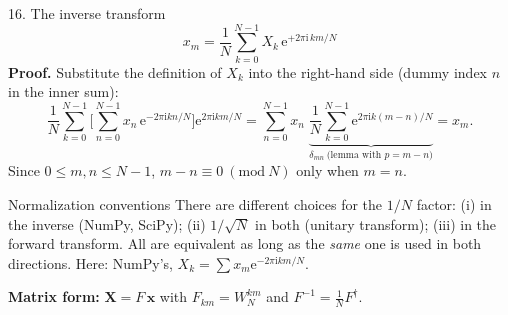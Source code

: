 \documentclass[aspectratio=169,10pt]{beamer}
\newcommand{\ii}{\mathrm{i}}
\newcommand{\ee}{\mathrm{e}}
\begin{document}
\begin{frame}{16. The inverse transform}
  \small
  \[
    \boxed{x_m=\frac1N\sum_{k=0}^{N-1}X_k\,\ee^{+2\pi\ii\,km/N}}
  \]
  \textbf{Proof.} Substitute the definition of $X_k$ into the right-hand side (dummy index $n$ in the inner sum):
  \[
    \frac1N\sum_{k=0}^{N-1}\Big[\sum_{n=0}^{N-1}x_n\,\ee^{-2\pi\ii kn/N}\Big]\ee^{2\pi\ii km/N}
    =\sum_{n=0}^{N-1}x_n\;\underbrace{\frac1N\sum_{k=0}^{N-1}\ee^{2\pi\ii k(m-n)/N}}_{\delta_{mn}\ \text{(lemma with }p=m-n)}=x_m .
  \]
  Since $0\le m,n\le N-1$, $m-n\equiv0\ (\mathrm{mod}\ N)$ only when $m=n$.
  \begin{warnbox}{Normalization conventions}
    There are different choices for the $1/N$ factor: (i) in the inverse (NumPy, SciPy); (ii) $1/\sqrt N$ in both (unitary transform); (iii) in the forward transform. All are equivalent as long as the \emph{same} one is used in both directions. Here: NumPy's, $X_k=\sum x_m \ee^{-2\pi\ii km/N}$.
  \end{warnbox}
  \textbf{Matrix form:} $\mathbf X=F\,\mathbf x$ with $F_{km}=W_N^{km}$ and $F^{-1}=\tfrac1N F^{\dagger}$.
\end{frame}
\end{document}
